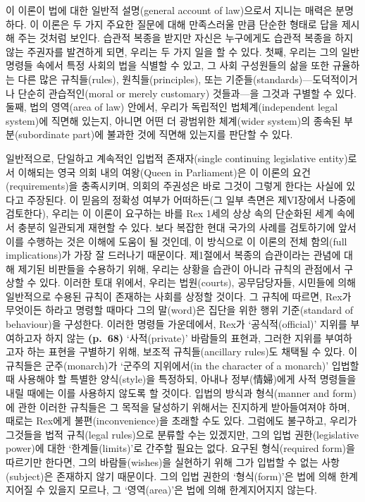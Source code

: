 이 이론이 법에 대한 일반적 설명(general account of law)으로서 지니는
매력은 분명하다. 이 이론은 두 가지 주요한 질문에 대해 만족스러울 만큼
단순한 형태로 답을 제시해 주는 것처럼 보인다. 습관적 복종을 받지만
자신은 누구에게도 습관적 복종을 하지 않는 주권자를 발견하게 되면, 우리는
두 가지 일을 할 수 있다. 첫째, 우리는 그의 일반 명령들 속에서 특정
사회의 법을 식별할 수 있고, 그 사회 구성원들의 삶을 또한 규율하는 다른
많은 규칙들(rules), 원칙들(principles), 또는
기준들(standards)---도덕적이거나 단순히 관습적인(moral or merely
customary) 것들과---을 그것과 구별할 수 있다. 둘째, 법의 영역(area of
law) 안에서, 우리가 독립적인 법체계(independent legal system)에 직면해
있는지, 아니면 어떤 더 광범위한 체계(wider system)의 종속된
부분(subordinate part)에 불과한 것에 직면해 있는지를 판단할 수 있다.

일반적으로, 단일하고 계속적인 입법적 존재자(single continuing
legislative entity)로서 이해되는 영국 의회 내의 여왕(Queen in
Parliament)은 이 이론의 요건(requirements)을 충족시키며, 의회의 주권성은
바로 그것이 그렇게 한다는 사실에 있다고 주장된다. 이 믿음의 정확성
여부가 어떠하든(그 일부 측면은 제VI장에서 나중에 검토한다), 우리는 이
이론이 요구하는 바를 Rex 1세의 상상 속의 단순화된 세계 속에서 충분히
일관되게 재현할 수 있다. 보다 복잡한 현대 국가의 사례를 검토하기에 앞서
이를 수행하는 것은 이해에 도움이 될 것인데, 이 방식으로 이 이론의 전체
함의(full implications)가 가장 잘 드러나기 때문이다. 제1절에서 복종의
습관이라는 관념에 대해 제기된 비판들을 수용하기 위해, 우리는 상황을
습관이 아니라 규칙의 관점에서 구상할 수 있다. 이러한 토대 위에서, 우리는
법원(courts), 공무담당자들, 시민들에 의해 일반적으로 수용된 규칙이
존재하는 사회를 상정할 것이다. 그 규칙에 따르면, Rex가 무엇이든 하라고
명령할 때마다 그의 말(word)은 집단을 위한 행위 기준(standard of
behaviour)을 구성한다. 이러한 명령들 가운데에서, Rex가
‘공식적(official)’ 지위를 부여하고자 하지 않는 \textbf{(p.~68)}
‘사적(private)’ 바람들의 표현과, 그러한 지위를 부여하고자 하는 표현을
구별하기 위해, 보조적 규칙들(ancillary rules)도 채택될 수 있다. 이
규칙들은 군주(monarch)가 ‘군주의 지위에서(in the character of a
monarch)’ 입법할 때 사용해야 할 특별한 양식(style)을 특정하되, 아내나
정부(情婦)에게 사적 명령들을 내릴 때에는 이를 사용하지 않도록 할 것이다.
입법의 방식과 형식(manner and form)에 관한 이러한 규칙들은 그 목적을
달성하기 위해서는 진지하게 받아들여져야 하며, 때로는 Rex에게
불편(inconvenience)을 초래할 수도 있다. 그럼에도 불구하고, 우리가
그것들을 법적 규칙(legal rules)으로 분류할 수는 있겠지만, 그의 입법
권한(legislative power)에 대한 ‘한계들(limits)’로 간주할 필요는 없다.
요구된 형식(required form)을 따르기만 한다면, 그의 바람들(wishes)을
실현하기 위해 그가 입법할 수 없는 사항(subject)은 존재하지 않기
때문이다. 그의 입법 권한의 ‘형식(form)’은 법에 의해 한계지어질 수 있을지
모르나, 그 ‘영역(area)’은 법에 의해 한계지어지지 않는다.

